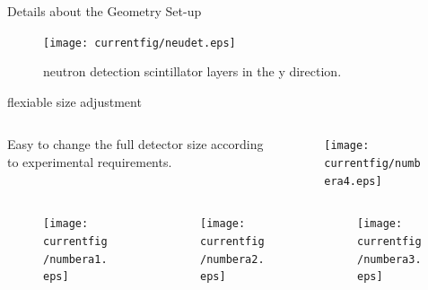 \documentclass[11pt,compress,xcolor=x11names,UTF8]{beamer}
\begin{document}
\begin{frame}{Details about the Geometry Set-up}
\begin{figure}
\centering
\texttt{[image: currentfig/neudet.eps]} %
\caption{neutron detection scintillator layers in the y direction.}
\end{figure}
\end{frame}
\begin{frame}{flexiable size adjustment}
\begin{columns}
\begin{column}{.6\textwidth}
Easy to change the full detector size according to experimental requirements.
\end{column}
\begin{column}{.3\textwidth}
\begin{figure}
\centering
\texttt{[image: currentfig/numbera4.eps]} %
\end{figure}
\end{column}
\end{columns}
\begin{columns}
\begin{column}{.3\textwidth}
\begin{figure}
\centering
\texttt{[image: currentfig/numbera1.eps]} %
\end{figure}
\end{column}
\begin{column}{.3\textwidth}
\begin{figure}[!tbp]
\centering
\texttt{[image: currentfig/numbera2.eps]} %
\end{figure}
\end{column}
\begin{column}{.36\textwidth}
\begin{figure}[!tbp]
\centering
\texttt{[image: currentfig/numbera3.eps]} %
\end{figure}
\end{column}
\end{columns}
\end{frame}
\end{document}
